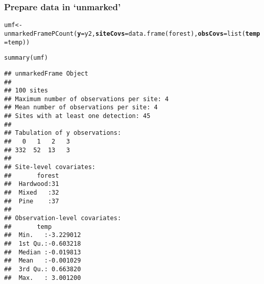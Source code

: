 \documentclass[color=usenames,dvipsnames]{beamer}\usepackage[]{graphicx}\usepackage[]{color}
\makeatletter
\newcommand{\hlstd}[1]{\textcolor[rgb]{0,0,0}{#1}}%
\newcommand{\hlkwb}[1]{\textcolor[rgb]{0,0.341,0.682}{#1}}%
\newcommand{\hlkwc}[1]{\textcolor[rgb]{0,0,0}{\textbf{#1}}}%
\newcommand{\hlkwd}[1]{\textcolor[rgb]{0.004,0.004,0.506}{#1}}%
\newenvironment{kframe}{%
 \def\at@end@of@kframe{}%
 \ifinner\ifhmode%
  \def\at@end@of@kframe{\end{minipage}}%
  \begin{minipage}{\columnwidth}%
 \fi\fi%
 \def\FrameCommand##1{\hskip\@totalleftmargin \hskip-\fboxsep
 \colorbox{shadecolor}{##1}\hskip-\fboxsep
     \hskip-\linewidth \hskip-\@totalleftmargin \hskip\columnwidth}%
 \MakeFramed {\advance\hsize-\width
   \@totalleftmargin\z@ \linewidth\hsize
   \@setminipage}}%
 {\par\unskip\endMakeFramed%
 \at@end@of@kframe}
\newenvironment{knitrout}{}{} %
\makeatother
\begin{document}
\begin{frame}[fragile]
\begin{columns}
\begin{column}{0.6\textwidth}
  \end{column}
  \end{columns}
\end{frame}




\begin{frame}[fragile]
  \frametitle{Prepare data in `unmarked'}
  \small
\begin{knitrout}\tiny
{}\color{fgcolor}\begin{kframe}
\begin{alltt}
\hlstd{umf} \hlkwb{<-} \hlkwd{unmarkedFramePCount}\hlstd{(}\hlkwc{y}\hlstd{=y2,} \hlkwc{siteCovs}\hlstd{=}\hlkwd{data.frame}\hlstd{(forest),} \hlkwc{obsCovs}\hlstd{=}\hlkwd{list}\hlstd{(}\hlkwc{temp}\hlstd{=temp))}
\end{alltt}
\end{kframe}
\end{knitrout}
\pause
\begin{knitrout}\tiny
{}\color{fgcolor}\begin{kframe}
\begin{alltt}
\hlkwd{summary}\hlstd{(umf)}
\end{alltt}
\begin{verbatim}
## unmarkedFrame Object
## 
## 100 sites
## Maximum number of observations per site: 4 
## Mean number of observations per site: 4 
## Sites with at least one detection: 45 
## 
## Tabulation of y observations:
##   0   1   2   3 
## 332  52  13   3 
## 
## Site-level covariates:
##       forest  
##  Hardwood:31  
##  Mixed   :32  
##  Pine    :37  
## 
## Observation-level covariates:
##       temp          
##  Min.   :-3.229012  
##  1st Qu.:-0.603218  
##  Median :-0.019813  
##  Mean   :-0.001029  
##  3rd Qu.: 0.663820  
##  Max.   : 3.001200
\end{verbatim}
\end{kframe}
\end{knitrout}
\end{frame}
\end{document}
